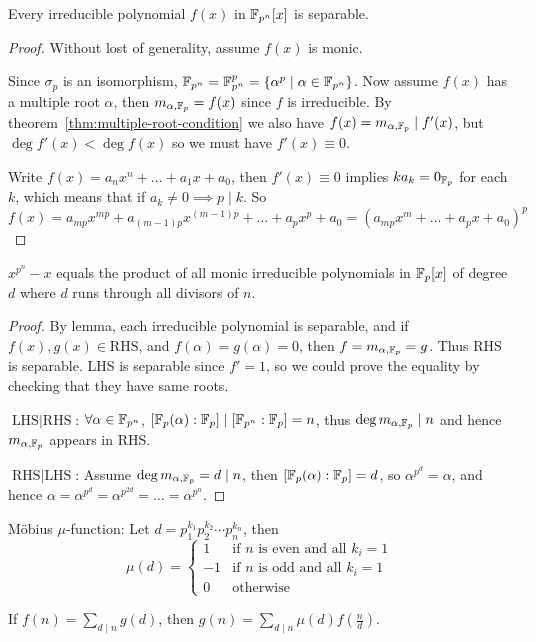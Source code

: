 \begin{lemma}
  Every irreducible polynomial $f(x)$ in $\mathbb{F}_{p^n}[x]$ is separable.

  \begin{proof}
    Without lost of generality, assume $f(x)$ is monic.

    Since $\sigma_p$ is an isomorphism, $\mathbb{F}_{p^n} = \mathbb{F}_{p^n}^p = \{ \alpha^p \mid \alpha \in \mathbb{F}_{p^n}\}$.
    Now assume $f(x)$ has a multiple root $\alpha$, then $m_{\alpha, \mathbb{F}_p} = f(x)$ since $f$
    is irreducible. By theorem~\ref{thm:multiple-root-condition} we also have
    $f(x) = m_{\alpha, \mathbb{F}_p} \mid f'(x)$, but $\deg f'(x) < \deg f(x)$ so we must have $f'(x) \equiv 0$.

    Write $f(x) = a_n x^n + \ldots + a_1 x + a_0$, then $f'(x) \equiv 0$ implies $k a_k = 0_{\mathbb{F}_p}$ for each $k$,
    which means that if $a_k \neq 0 \implies p \mid k$. So
    \[ f(x) = a_{mp} x^{mp} + a_{(m-1)p} x^{(m-1)p} + \ldots + a_p x^p + a_0 = (a_{mp} x^m + \ldots + a_p x + a_0)^p \]
  \end{proof}
\end{lemma}

\begin{theorem}
  $x^{p^n} - x$ equals the product of all monic irreducible polynomials in $\mathbb{F}_p[x]$ of degree $d$ where
  $d$ runs through all divisors of $n$.

  \begin{proof}
    By lemma, each irreducible polynomial is separable, and if $f(x), g(x) \in \text{RHS}$,
    and $f(\alpha) = g(\alpha) = 0$, then $f = m_{\alpha, \mathbb{F}_p} = g$. Thus RHS is separable.
    LHS is separable since $f' = 1$, so we could prove the equality by checking that
    they have same roots.

    $\text{LHS} \mid \text{RHS}$: $\forall \alpha \in \mathbb{F}_{p^n}$, $[\mathbb{F}_p(\alpha): \mathbb{F}_p] \mid [\mathbb{F}_{p^n}: \mathbb{F}_p] = n$,
    thus $\deg m_{\alpha, \mathbb{F}_p} \mid n$ and hence $m_{\alpha, \mathbb{F}_p}$ appears in RHS.

    $\text{RHS} \mid \text{LHS}$: Assume $\deg m_{\alpha, \mathbb{F}_p} = d \mid n$, then
    $[\mathbb{F}_p(\alpha): \mathbb{F}_p] = d$, so $\alpha^{p^d} = \alpha$, and hence
    $\alpha = \alpha^{p^d} = \alpha^{p^{2d}} = \dots = \alpha^{p^n}$.
  \end{proof}
\end{theorem}

\begin{definition}
  M\"{o}bius $\mu$-function:
  Let $d = p_1^{k_1} p_2^{k_2} \dotsm p_n^{k_n}$, then
  \[
    \mu(d) = \begin{cases}
      1 & \text{if $n$ is even and all $k_i = 1$} \\
      -1 & \text{if $n$ is odd and all $k_i = 1$} \\
      0 & \text{otherwise}
    \end{cases}
  \]
\end{definition}

\begin{theorem}
  If $f(n) = \sum\limits_{d \mid n} g(d)$, then
  $g(n) = \sum\limits_{d \mid n} \mu(d) f\left(\frac{n}{d}\right)$.
\end{theorem}
